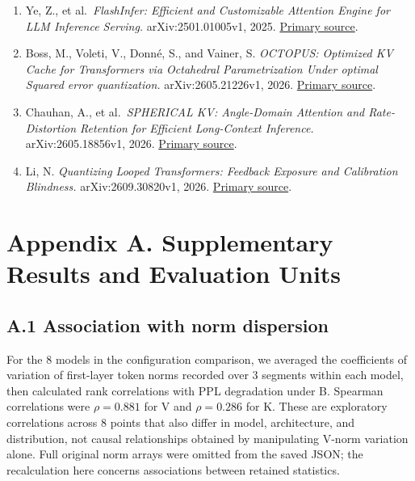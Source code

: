 \documentclass[10pt,a4paper]{article}
\begin{document}
\begin{enumerate}
  Fernández-Menduiña, S., et al.~\emph{Spend Bits Where Queries Look: KV Cache Vector Quantization with Attention-Preserving Transforms.} arXiv:2608.04074v1, 2026. \href{https://arxiv.org/html/2608.04074v1}{Primary source}.
\item
  Ye, Z., et al.~\emph{FlashInfer: Efficient and Customizable Attention Engine for LLM Inference Serving.} arXiv:2501.01005v1, 2025. \href{https://arxiv.org/html/2501.01005v1}{Primary source}.
\item
  Boss, M., Voleti, V., Donné, S., and Vainer, S. \emph{OCTOPUS: Optimized KV Cache for Transformers via Octahedral Parametrization Under optimal Squared error quantization.} arXiv:2605.21226v1, 2026. \href{https://arxiv.org/html/2605.21226v1}{Primary source}.
\item
  Chauhan, A., et al.~\emph{SPHERICAL KV: Angle-Domain Attention and Rate-Distortion Retention for Efficient Long-Context Inference.} arXiv:2605.18856v1, 2026. \href{https://arxiv.org/html/2605.18856v1}{Primary source}.
\item
  Li, N. \emph{Quantizing Looped Transformers: Feedback Exposure and Calibration Blindness.} arXiv:2609.30820v1, 2026. \href{https://arxiv.org/html/2609.30820v1}{Primary source}.
\end{enumerate}

\clearpage

\endgroup\section{Appendix A. Supplementary Results and Evaluation Units}\label{appendix-a.-supplementary-results-and-evaluation-units}

\subsection{A.1 Association with norm dispersion}\label{a.1-association-with-norm-dispersion}

For the 8 models in the configuration comparison, we averaged the coefficients of variation of first-layer token norms recorded over 3 segments within each model, then calculated rank correlations with PPL degradation under B. Spearman correlations were \(\rho=0.881\) for V and \(\rho=0.286\) for K. These are exploratory correlations across 8 points that also differ in model, architecture, and distribution, not causal relationships obtained by manipulating V-norm variation alone. Full original norm arrays were omitted from the saved JSON; the recalculation here concerns associations between retained statistics.
\end{document}
